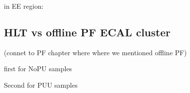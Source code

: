 
in EE region:





\subsection{HLT vs offline PF ECAL cluster}

(connet to PF chapter where where we mentioned offline PF)

first for NoPU samples

Second for PUU samples

